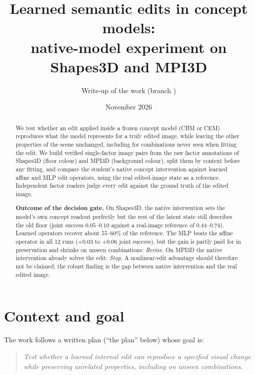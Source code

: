 \documentclass[11pt,a4paper]{article}
\title{Learned semantic edits in concept models:\\
native-model experiment on Shapes3D and MPI3D}
\author{Write-up of the \code{experiments/semantic_edits} work (branch \code{cvpr-semantic-edits})}
\date{November 2026}
\begin{document}
\maketitle

\begin{abstract}
We test whether an edit applied inside a frozen concept model (CBM or CEM) reproduces what the model represents for
a truly edited image, while leaving the other properties of the scene unchanged, including for combinations never
seen when fitting the edit. We build verified single-factor image pairs from the raw factor annotations of Shapes3D
(floor colour) and MPI3D (background colour), split them by context before any fitting, and compare the student's
native concept intervention against learned affine and MLP edit operators, using the real edited-image state as a
reference. Independent factor readers judge every edit against the ground truth of the edited image.

\smallskip
\textbf{Outcome of the decision gate.} On Shapes3D, the native intervention sets the model's own concept readout
perfectly but the rest of the latent state still describes the old floor (joint success $0.05$--$0.10$ against a
real-image reference of $0.44$--$0.74$). Learned operators recover about $55$--$60\%$ of the reference. The MLP beats
the affine operator in all 12 runs ($+0.03$ to $+0.06$ joint success), but the gain is partly paid for in preservation
and shrinks on unseen combinations: \emph{Revise}. On MPI3D the native intervention already solves the edit:
\emph{Stop}. A nonlinear-edit advantage should therefore not be claimed; the robust finding is the gap between native
intervention and the real edited image.
\end{abstract}

\tableofcontents
\newpage

\section{Context and goal}

The work follows a written plan (``the plan'' below) whose goal is:

\begin{quote}
\emph{Test whether a learned internal edit can reproduce a specified visual change while preserving unrelated
properties, including on unseen combinations.}
\end{quote}
\end{document}
